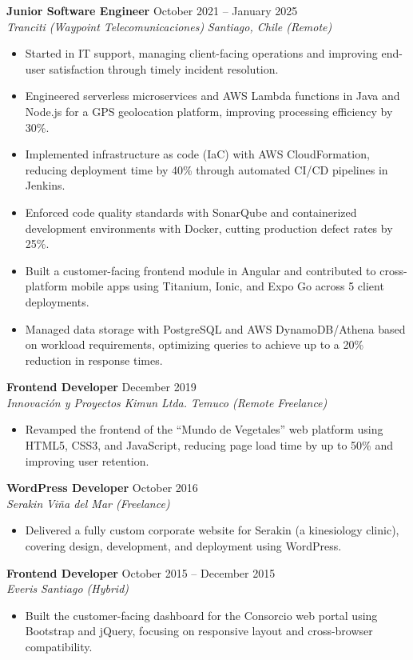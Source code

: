 \documentclass[11pt,a4paper]{article}
\newcommand{\job}[4]{%
    \textbf{#1} \hfill #2\\
    \textit{#3} \hfill \textit{#4}\\[2pt]
}
\begin{document}
\job{Junior Software Engineer}{October 2021 -- January 2025}{Tranciti (Waypoint Telecomunicaciones)}{Santiago, Chile (Remote)}
\begin{itemize}[leftmargin=*, itemsep=1pt, topsep=2pt]
    \item Started in IT support, managing client-facing operations and improving end-user satisfaction through timely incident resolution.
    \item Engineered serverless microservices and AWS Lambda functions in Java and Node.js for a GPS geolocation platform, improving processing efficiency by 30\%.
    \item Implemented infrastructure as code (IaC) with AWS CloudFormation, reducing deployment time by 40\% through automated CI/CD pipelines in Jenkins.
    \item Enforced code quality standards with SonarQube and containerized development environments with Docker, cutting production defect rates by 25\%.
    \item Built a customer-facing frontend module in Angular and contributed to cross-platform mobile apps using Titanium, Ionic, and Expo Go across 5 client deployments.
    \item Managed data storage with PostgreSQL and AWS DynamoDB/Athena based on workload requirements, optimizing queries to achieve up to a 20\% reduction in response times.
\end{itemize}

\job{Frontend Developer}{December 2019}{Innovación y Proyectos Kimun Ltda.}{Temuco (Remote Freelance)}
\begin{itemize}[leftmargin=*, itemsep=1pt, topsep=2pt]
    \item Revamped the frontend of the ``Mundo de Vegetales'' web platform using HTML5, CSS3, and JavaScript, reducing page load time by up to 50\% and improving user retention.
\end{itemize}

\job{WordPress Developer}{October 2016}{Serakin}{Viña del Mar (Freelance)}
\begin{itemize}[leftmargin=*, itemsep=1pt, topsep=2pt]
    \item Delivered a fully custom corporate website for Serakin (a kinesiology clinic), covering design, development, and deployment using WordPress.
\end{itemize}

\job{Frontend Developer}{October 2015 -- December 2015}{Everis}{Santiago (Hybrid)}
\begin{itemize}[leftmargin=*, itemsep=1pt, topsep=2pt]
    \item Built the customer-facing dashboard for the Consorcio web portal using Bootstrap and jQuery, focusing on responsive layout and cross-browser compatibility.
\end{itemize}
\end{document}
